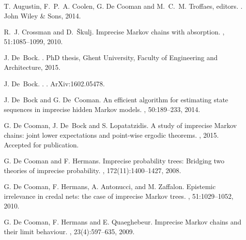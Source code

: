 \documentclass[11pt,dvipsnames,usenames,a4paper]{article}
\begin{document}
\vspace{-3pt}


\renewcommand\refname{\normalsize Enumerate the bibliographical references that are relevant for your research proposal.}
%
\begin{thebibliography}{10}

T. Augustin, F.~P.~A. Coolen, G. De Cooman and M.~C.~M.
  Troffaes, editors.
.
\newblock John Wiley \& Sons, 2014.

R.~J. Crossman and D.~\v{S}kulj.
\newblock Imprecise {M}arkov chains with absorption.
, 51:1085--1099,
  2010.

J. De~Bock.
.
\newblock PhD thesis, Ghent University, Faculty of Engineering and
  Architecture, 2015.

J. De~Bock.
.
.
\newblock ArXiv:1602.05478.

J. De~Bock and G. De~Cooman.
\newblock An efficient algorithm for estimating state sequences in imprecise
  hidden {M}arkov models.
, 50:189--233, 2014.

G. De Cooman, J. De~Bock and S. Lopatatzidis.
\newblock A study of imprecise {M}arkov chains: joint lower expectations and
  point-wise ergodic theorems.
, 2015.
\newblock Accepted for publication.

G. De Cooman and F. Hermans.
\newblock Imprecise probability trees: Bridging two theories of imprecise
  probability.
, 172(11):1400--1427, 2008.

G. De Cooman, F. Hermans, A. Antonucci, and M. Zaffalon.
\newblock Epistemic irrelevance in credal nets: the case of imprecise {M}arkov
  trees.
, 51:1029--1052,
  2010.

G. De Cooman, F. Hermans and E. Quaeghebeur.
\newblock Imprecise {M}arkov chains and their limit behaviour.
,
  23(4):597--635, 2009.


\end{thebibliography}
\end{document}
